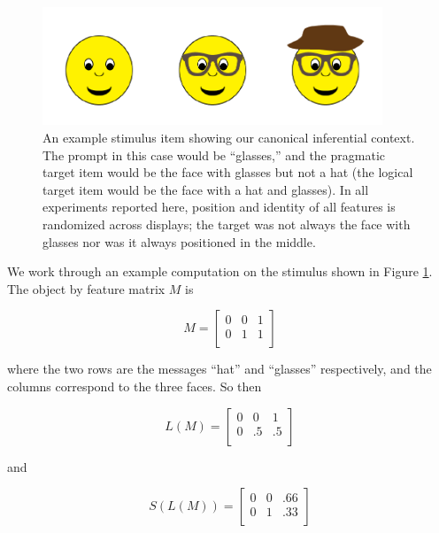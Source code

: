 \begin{figure}[t]
  \centering
  \includegraphics[width=4in]{figures/hatglasses.pdf}
  \caption{\label{fig:ex} An example stimulus item showing our canonical inferential context. The prompt in this case would be ``glasses,'' and the pragmatic target item would be the face with glasses but not a hat (the logical target item would be the face with a hat and glasses). In all experiments reported here, position and identity of all features is randomized across displays; the target was not always the face with glasses nor was it always positioned in the middle.}
\end{figure}

We work through an example computation on the stimulus shown in Figure \ref{fig:ex}. The object by feature matrix $M$ is

\begin{equation}
M = \left[
    \begin{array}{ccc}
      0 & 0 & 1 \\
      0 & 1 & 1\\
    \end{array} 
  \right]
\end{equation}

\noindent where the two rows are the messages ``hat'' and ``glasses'' respectively, and the columns correspond to the three faces. So then


\begin{equation}
L(M) = \left[
    \begin{array}{ccc}
      0 & 0 & 1 \\
      0 & .5 & .5\\
    \end{array} 
  \right]
\end{equation}

and 

\begin{equation}
S(L(M)) = \left[
    \begin{array}{ccc}
      0 & 0 & .66 \\
      0 & 1 & .33\\
    \end{array} 
  \right]
\end{equation}

